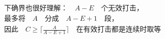 \documentclass[preview]{standalone}
\begin{document}
\begin{align*}
& \text{下确界也很好理解：} \quad A - E \quad \text{个无效打击，} \\ & \text{最多将} \quad A \quad \text{分成} \quad A - E + 1 \quad \text{段，} \\ & \text{因此} \quad C \geq \lceil \frac{A}{A - E + 1} \rceil \quad \text{在有效打击都是连续时取等}
\end{align*}
\end{document}
